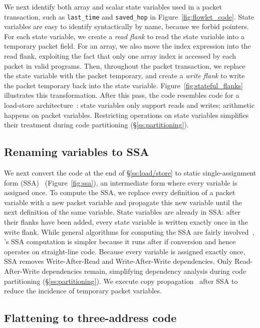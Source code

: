 We next identify both array and scalar state variables used in a packet
transaction, such as \texttt{last\_time} and \texttt{saved\_hop} in
Figure~\ref{fig:flowlet_code}. State variables are easy to identify
syntactically by name, because we forbid pointers. For each state variable, we
create a \textit{read flank} to read the state variable into a temporary packet
field. For an array, we also move the index expression into the read flank,
exploiting the fact that only one array index is accessed by each packet in
valid \pktlanguage programs.  Then, throughout the packet transaction, we
replace the state variable with the packet temporary, and create a
\textit{write flank} to write the packet temporary back into the state
variable.  Figure~\ref{fig:stateful_flanks} illustrates this transformation.
After this pass, the code resembles code for a load-store
architecture~\cite{load_store}: state variables only support reads and writes;
arithmetic happens on packet variables.  Restricting operations on state
variables simplifies their treatment during code partitioning
(\S\ref{ss:partitioning}).

\subsection{Renaming variables to SSA}
\label{ss:ssa}

We next convert the code at the end of \S\ref{ss:load/store} to static
single-assignment form (SSA)~\cite{ssa} (Figure~\ref{fig:ssa}), an intermediate
form where every variable is assigned once. To compute the SSA, we replace
every definition of a packet variable with a new packet variable and propagate
this new variable until the next definition of the same variable. State
variables are already in SSA: after their flanks have been added, every state
variable is written exactly once in the write flank.  While general algorithms
for computing the SSA are fairly involved~\cite{ssa}, \pktlanguage's SSA
computation is simpler because it runs after if conversion and hence operates
on straight-line code.  Because every variable is assigned exactly once, SSA
removes Write-After-Read and Write-After-Write dependencies. Only
Read-After-Write dependencies remain, simplifying dependency analysis during
code partitioning (\S\ref{ss:partitioning}). We execute copy
propagation~\cite{copy_prop} after SSA to reduce the incidence of temporary
packet variables.

\subsection{Flattening to three-address code}

